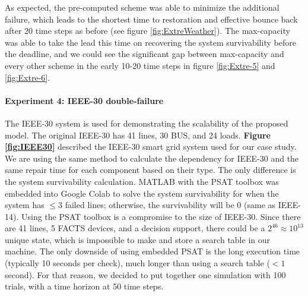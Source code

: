 \documentclass[conference]{IEEEtran}
\begin{document}
As expected, the pre-computed scheme was able to minimize the additional failure, which leads to the shortest time to restoration and effective bounce back after 20 time steps as before (see figure \ref{fig:ExtreWeather}). The max-capacity was able to take the lead this time on recovering the system survivability before the deadline, and we could see the significant gap between max-capacity and every other scheme in the early 10-20 time steps in figure \ref{fig:Extre-5} and \ref{fig:Extre-6}.


\paragraph{Experiment 4: IEEE-30 double-failure}
The IEEE-30 system is used for demonstrating the scalability of the proposed model. The original IEEE-30 has 41 lines, 30 BUS, and 24 loads.
\textbf{Figure \ref{fig:IEEE30}} described the IEEE-30 smart grid system used for our case study. We are using the same method to calculate the dependency for IEEE-30 and the same repair time for each component based on their type. The only difference is the system survivability calculation. MATLAB with the PSAT toolbox was embedded into Google Colab to solve the system survivability for when the system has $\leq 3$ failed lines; otherwise, the survivability will be 0 (same as IEEE-14). Using the PSAT toolbox is a compromise to the size of IEEE-30. Since there are 41 lines, 5 FACTS devices, and a decision support, there could be a $2^{46} \approx 10^{13}$ unique state, which is impossible to make and store a search table in our machine. The only downside of using embedded PSAT is the long execution time (typically 10 seconds per check), much longer than using a search table ($< 1$ second). %
For that reason, we decided to put together one simulation with 100 trials, with a time horizon at 50 time steps.
\end{document}
